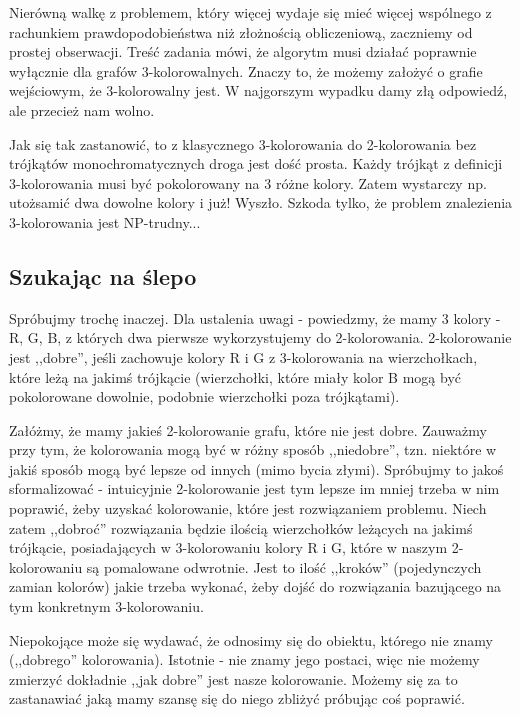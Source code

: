 \documentclass[a4paper,11pt]{article}
\begin{document}
Nierówną walkę z problemem, który więcej wydaje się mieć więcej wspólnego z
rachunkiem prawdopodobieństwa niż złożnością obliczeniową, zaczniemy od prostej
obserwacji. Treść zadania mówi, że algorytm musi działać poprawnie wyłącznie dla
grafów 3-kolorowalnych. Znaczy to, że możemy założyć o grafie wejściowym, że
3-kolorowalny jest. W najgorszym wypadku damy złą odpowiedź, ale przecież nam
wolno.

Jak się tak zastanowić, to z klasycznego 3-kolorowania do 2-kolorowania bez
trójkątów monochromatycznych droga jest dość prosta. Każdy trójkąt z definicji
3-kolorowania musi być pokolorowany na 3 różne kolory. Zatem wystarczy np.
utożsamić dwa dowolne kolory i już! Wyszło. Szkoda tylko, że problem znalezienia
3-kolorowania jest NP-trudny... \\


\subsection*{Szukając na ślepo}

Spróbujmy trochę inaczej. Dla ustalenia uwagi - powiedzmy, że mamy 3
kolory - R, G, B, z których dwa pierwsze wykorzystujemy do 2-kolorowania.
2-kolorowanie jest ,,dobre'', jeśli zachowuje kolory R i G z 3-kolorowania
na wierzchołkach, które leżą na jakimś trójkącie
(wierzchołki, które miały kolor B mogą być pokolorowane dowolnie, podobnie
wierzchołki poza trójkątami).


Załóżmy, że mamy jakieś 2-kolorowanie grafu, które nie jest dobre. Zauważmy przy
tym, że kolorowania mogą być w różny sposób ,,niedobre'', tzn. niektóre w jakiś
sposób mogą być lepsze od innych (mimo bycia złymi). Spróbujmy to jakoś
sformalizować - intuicyjnie 2-kolorowanie jest tym lepsze im mniej trzeba w nim
poprawić, żeby uzyskać kolorowanie, które jest rozwiązaniem problemu. Niech
zatem ,,dobroć'' rozwiązania będzie ilością wierzchołków leżących na jakimś
trójkącie, posiadających w 3-kolorowaniu kolory R i G, które w naszym 2-kolorowaniu
są pomalowane odwrotnie. Jest to ilość ,,kroków'' (pojedynczych zamian kolorów)
jakie trzeba wykonać, żeby dojść do rozwiązania bazującego na tym konkretnym
3-kolorowaniu. 

Niepokojące może się wydawać, że odnosimy się do obiektu, którego nie znamy
(,,dobrego'' kolorowania). Istotnie - nie znamy jego postaci, więc nie możemy
zmierzyć dokładnie ,,jak dobre'' jest nasze kolorowanie. Możemy się za to
zastanawiać jaką mamy szansę się do niego zbliżyć próbując coś poprawić. \\
\end{document}
